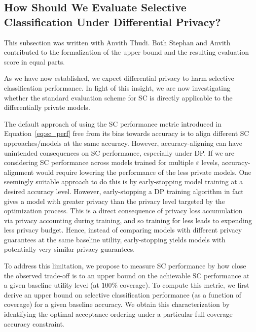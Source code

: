 \subsection{How Should We Evaluate Selective Classification Under Differential Privacy?}
\label{sec:new_metric}

\begin{contriback}
This subsection was written with Anvith Thudi. Both Stephan and Anvith contributed to the formalization of the upper bound and the resulting evaluation score in equal parts.
\end{contriback}

As we have now established, we expect differential privacy to harm selective classification performance. In light of this insight, we are now investigating whether the standard evaluation scheme for SC is directly applicable to the differentially private models.

The default approach of using the SC performance metric introduced in Equation~\ref{eq:sc_perf} free from its bias towards accuracy is to align different SC approaches/models at the same accuracy. However, accuracy-aligning can have unintended consequences on SC performance, especially under DP. If we are considering SC performance across models trained for multiple $\varepsilon$ levels, accuracy-alignment would require lowering the performance of the less private models. One seemingly suitable approach to do this is by early-stopping model training at a desired accuracy level. However, early-stopping a DP training algorithm in fact gives a model with greater privacy than the privacy level targeted by the optimization process. This is a direct consequence of privacy loss accumulation via privacy accounting during training, and so training for less leads to expending less privacy budget. Hence, instead of comparing models with different privacy guarantees at the same baseline utility, early-stopping yields models with potentially very similar privacy guarantees. 

To address this limitation, we propose to measure SC performance by how close the observed trade-off is to an upper bound on the achievable SC performance at a given baseline utility level (at $100\%$ coverage). To compute this metric, we first derive an upper bound on selective classification performance (as a function of coverage) for a given baseline accuracy. We obtain this characterization by identifying the optimal acceptance ordering under a particular full-coverage accuracy constraint. 

